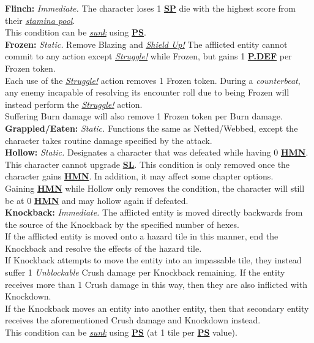 \documentclass[12pt]{article}
\newcommand{\refto}[1]{\hyperlink{#1}{\textbf{#1}}}
\newcommand{\reftoit}[1]{\hyperlink{#1}{\emph{#1}}}
\begin{document}
\begin{multicols*}{2}
\textbf{Flinch:} \emph{Immediate.} The character loses 1 \refto{SP} die with the highest score from their \reftoit{stamina pool}.\\
This condition can be \reftoit{sunk} using \refto{PS}.\\

\textbf{Frozen:} \emph{Static.} Remove Blazing and \reftoit{Shield Up!} The afflicted entity cannot commit to any action except \reftoit{Struggle!} while Frozen, but gains 1 \refto{P.DEF} per Frozen token.\\
Each use of the \reftoit{Struggle!} action removes 1 Frozen token. During a \emph{counterbeat}, any enemy incapable of resolving its encounter roll due to being Frozen will instead perform the \reftoit{Struggle!} action.\\
Suffering Burn damage will also remove 1 Frozen token per Burn damage.\\

\textbf{Grappled/Eaten:} \emph{Static.} Functions the same as Netted/Webbed, except the character takes routine damage specified by the attack.\\

\textbf{Hollow:} \emph{Static.} Designates a character that was defeated while having 0 \refto{HMN}. This character cannot upgrade \refto{SL}. This condition is only removed once the character gains \refto{HMN}. In addition, it may affect some chapter options.\\
Gaining \refto{HMN} while Hollow only removes the condition, the character will still be at 0 \refto{HMN} and may hollow again if defeated.\\

\textbf{Knockback:} \emph{Immediate.} The afflicted entity is moved directly backwards from the source of the Knockback by the specified number of hexes.\\
If the afflicted entity is moved onto a hazard tile in this manner, end the Knockback and resolve the effects of the hazard tile.\\
If Knockback attempts to move the entity into an impassable tile, they instead suffer 1 \emph{Unblockable} Crush damage per Knockback remaining. If the entity receives more than 1 Crush damage in this way, then they are also inflicted with Knockdown.\\
If the Knockback moves an entity into another entity, then that secondary entity receives the aforementioned Crush damage and Knockdown instead.\\
This condition can be \reftoit{sunk} using \refto{PS} (at 1 tile per \refto{PS} value).


\end{multicols*}
\end{document}

